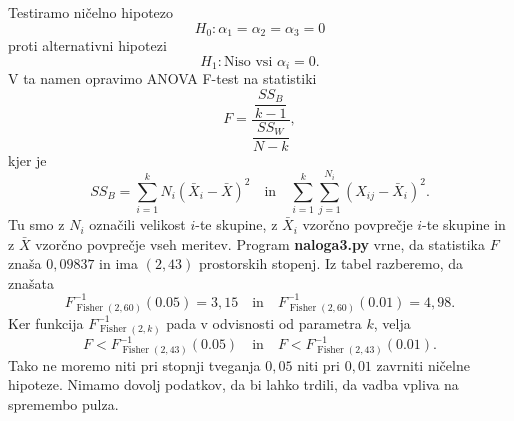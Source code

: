 \documentclass[a4paper,11pt]{article}
\DeclareMathOperator{\Fisher}{Fisher}
\begin{document}
Testiramo ničelno hipotezo
\[H_0: \alpha_1 = \alpha_2 = \alpha_3 = 0\]
proti alternativni hipotezi
\[H_1: \text{Niso vsi } \alpha_i = 0.\]
V ta namen opravimo ANOVA F-test na statistiki
\[F = \frac{\dfrac{SS_B}{k-1}}{\dfrac{SS_W}{N-k}},\]
kjer je 
\[SS_B = \sum_{i=1}^k N_i(\bar{X}_i - \bar{X})^2 \quad \text{in} \quad \sum_{i=1}^k \sum_{j=1}^{N_i}(X_{ij}-\bar{X}_i)^2.\]
Tu smo z $N_i$ označili velikost $i$-te skupine, z $\bar{X}_i$ vzorčno povprečje $i$-te skupine in z $\bar{X}$ vzorčno povprečje vseh meritev.
Program \textbf{naloga3.py} vrne, da statistika $F$ znaša $0,09837$ in ima $(2, 43)$ prostorskih stopenj.
Iz tabel razberemo, da znašata 
\[F^{-1}_{\Fisher(2, 60)}(0.05) = 3{,}15 \quad \text{in} \quad F^{-1}_{\Fisher(2, 60)}(0.01) = 4{,}98.\]
Ker funkcija $F^{-1}_{\Fisher(2, k)}$ pada v odvisnosti od parametra $k$, velja
\[F < F^{-1}_{\Fisher(2, 43)}(0.05) \quad \text{in} \quad F < F^{-1}_{\Fisher(2, 43)}(0.01).\]
Tako ne moremo niti pri stopnji tveganja $0{,}05$ niti pri $0{,}01$ zavrniti ničelne hipoteze.
Nimamo dovolj podatkov, da bi lahko trdili, da vadba vpliva na spremembo pulza.
\end{document}
